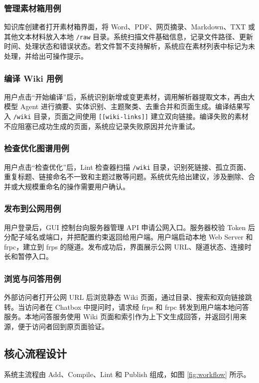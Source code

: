 \documentclass[UTF8,a4paper,12pt,fontset=fandol]{ctexart}
\newcommand{\code}[1]{\texttt{\footnotesize #1}}
\begin{document}
\subsubsection{管理素材箱用例}
知识库创建者打开素材箱界面，将 Word、PDF、网页摘录、Markdown、TXT 或其他文本材料放入本地 \code{/raw} 目录。系统扫描文件基础信息，记录文件路径、更新时间、处理状态和错误状态。若文件暂不支持解析，系统应在素材列表中标记为未处理，并给出可操作提示。

\subsubsection{编译 Wiki 用例}
用户点击“开始编译”后，系统识别新增或变更素材，调用解析器提取文本，再由大模型 Agent 进行摘要、实体识别、主题聚类、去重合并和页面生成。编译结果写入 \code{/wiki} 目录，页面之间使用 \code{[[wiki-links]]} 建立双向链接。编译失败的素材不应阻塞已成功生成的页面，系统应记录失败原因并允许重试。

\subsubsection{检查优化图谱用例}
用户点击“检查优化”后，Lint 检查器扫描 \code{/wiki} 目录，识别死链接、孤立页面、重复标题、链接命名不一致和主题过散等问题。系统优先给出建议，涉及删除、合并或大规模重命名的操作需要用户确认。

\subsubsection{发布到公网用例}
用户登录后，GUI 控制台向服务器管理 API 申请公网入口。服务器校验 Token 后分配子域名或端口，并把配置约束返回给用户端。用户端启动本地 Web Server 和 frpc，建立到 frps 的隧道。发布成功后，界面展示公网 URL、隧道状态、连接时长和暂停入口。

\subsubsection{浏览与问答用例}
外部访问者打开公网 URL 后浏览静态 Wiki 页面，通过目录、搜索和双向链接跳转。当访问者在 Chatbox 中提问时，请求经 frps 和 frpc 转发到用户端本地问答服务。本地问答服务使用 Wiki 页面和索引作为上下文生成回答，并返回引用来源，便于访问者回到原页面验证。

\subsection{核心流程设计}
系统主流程由 Add、Compile、Lint 和 Publish 组成，如图 \ref{fig:workflow} 所示。
\end{document}
